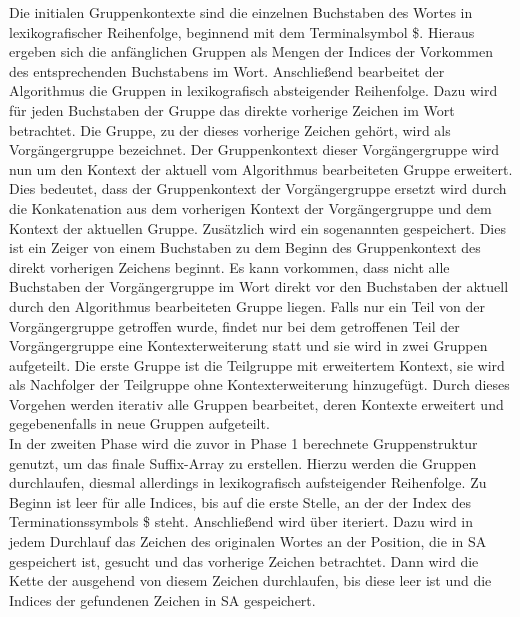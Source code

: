 Die initialen Gruppenkontexte sind die einzelnen Buchstaben des Wortes in lexikografischer Reihenfolge, beginnend mit dem Terminalsymbol \$.
Hieraus ergeben sich die anfänglichen Gruppen als Mengen der Indices der Vorkommen des entsprechenden Buchstabens im Wort.
Anschließend bearbeitet der Algorithmus die Gruppen in lexikografisch absteigender Reihenfolge. 
Dazu wird für jeden Buchstaben der Gruppe das direkte vorherige Zeichen im Wort betrachtet.
Die Gruppe, zu der dieses vorherige Zeichen gehört, wird als Vorgängergruppe bezeichnet.
Der Gruppenkontext dieser Vorgängergruppe wird nun um den Kontext der aktuell vom Algorithmus bearbeiteten Gruppe erweitert.
Dies bedeutet, dass der Gruppenkontext der Vorgängergruppe ersetzt wird durch die Konkatenation aus dem vorherigen Kontext der Vorgängergruppe und dem Kontext der aktuellen Gruppe.
Zusätzlich wird ein sogenannten \prevpointer gespeichert.
Dies ist ein Zeiger von einem Buchstaben zu dem Beginn des Gruppenkontext des direkt vorherigen Zeichens beginnt.
Es kann vorkommen, dass nicht alle Buchstaben der Vorgängergruppe im Wort direkt vor den Buchstaben der aktuell durch den Algorithmus bearbeiteten Gruppe liegen.
Falls nur ein Teil von der Vorgängergruppe getroffen wurde, findet nur bei dem getroffenen Teil der Vorgängergruppe eine Kontexterweiterung statt und sie wird in zwei Gruppen aufgeteilt.
Die erste Gruppe ist die Teilgruppe mit erweitertem Kontext, sie wird als Nachfolger der Teilgruppe ohne Kontexterweiterung hinzugefügt. 
Durch dieses Vorgehen werden iterativ alle Gruppen bearbeitet, deren Kontexte erweitert und gegebenenfalls in neue Gruppen aufgeteilt.\\

In der zweiten Phase wird die zuvor in Phase 1 berechnete Gruppenstruktur genutzt, um das finale Suffix-Array zu erstellen. 
Hierzu werden die Gruppen durchlaufen, diesmal allerdings in lexikografisch aufsteigender Reihenfolge.
Zu Beginn ist \sa leer für alle Indices, bis auf die erste Stelle, an der der Index des Terminationssymbols \$ steht.
Anschließend wird über \sa iteriert.
Dazu wird in jedem Durchlauf das Zeichen des originalen Wortes an der Position, die in SA gespeichert ist, gesucht und das vorherige Zeichen betrachtet. 
Dann wird die Kette der \prevpointer ausgehend von diesem Zeichen durchlaufen, bis diese leer ist und die Indices der gefundenen Zeichen in SA gespeichert. 